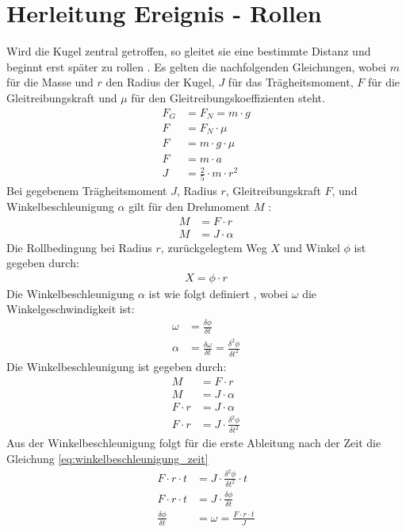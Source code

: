 \section{Herleitung Ereignis - Rollen}\label{anhang:herleitung:event:rollen}
Wird die Kugel zentral getroffen, so gleitet sie eine bestimmte Distanz und beginnt erst später zu rollen \cite{rollzeitpunkt}.
Es gelten die nachfolgenden Gleichungen, wobei $m$ für die Masse und $r$ den Radius der Kugel, $J$ für das
Trägheitsmoment, $F$ für die Gleitreibungskraft und $\mu$ für den Gleitreibungskoeffizienten steht.
\begin{align}
    F_G &= F_N = m \cdot g\\
    F &= F_N \cdot \mu\\
    F &= m \cdot g \cdot \mu\\
    F &= m \cdot a\\
    J &= \frac{2}{5} \cdot m \cdot r^2
\end{align}
Bei gegebenem Trägheitsmoment $J$, Radius $r$, Gleitreibungskraft $F$, und Winkelbeschleunigung $\alpha$ gilt für den Drehmoment $M$ \cite{wiki.drehmoment:1}:
\begin{align}
    M &= F \cdot r\\
    M &= J \cdot \alpha
\end{align}
Die Rollbedingung \cite{wiki.rollen:1} bei Radius $r$, zurückgelegtem Weg $X$ und Winkel $\phi$ ist gegeben durch:
\begin{align}
    X = \phi \cdot r\label{eq:rollbedingung}
\end{align}
Die Winkelbeschleunigung $\alpha$ ist wie folgt definiert \cite{wiki.winkelbeschleunigung:1}, wobei $\omega$ die Winkelgeschwindigkeit ist:
\begin{align}
    \omega &= \frac{\delta \phi}{\delta t}\\
    \alpha &= \frac{\delta \omega}{\delta t} = \frac{\delta^2 \phi}{\delta t^2}
\end{align}
Die Winkelbeschleunigung ist gegeben durch:
\begin{align}
    M &= F \cdot r\\
    M &= J \cdot \alpha\\
    F \cdot r &= J \cdot \alpha\\
    F \cdot r &= J \cdot \frac{\delta^2 \phi}{\delta t^2}
\end{align}
Aus der Winkelbeschleunigung folgt für die erste Ableitung nach der Zeit die Gleichung \ref{eq:winkelbeschleunigung_zeit}
\begin{align}
    F \cdot r \cdot t &= J \cdot \frac{\delta^2 \phi}{\delta t^2} \cdot t\\
    F \cdot r \cdot t &= J \cdot \frac{\delta \phi}{\delta t}\\
    \frac{\delta \phi}{\delta t} &= \omega = \frac{F \cdot r \cdot t}{J}\label{eq:winkelbeschleunigung_zeit}
\end{align}
